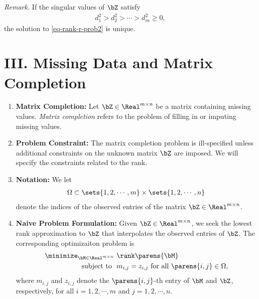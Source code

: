 \documentclass[12pt]{article}
\begin{document}
\begin{enumerate}[label=\textbf{\arabic*.}]
	\textit{Remark.} If the singular values of $\bZ$ satisfy 
	\begin{align*}
		d_1^2 > d_2^2 > \cdots > d_m^2 \ge 0, 
	\end{align*}
	the solution to \eqref{eq-rank-r-prob2} is unique. 

\end{enumerate}


\section*{III. Missing Data and Matrix Completion}

\begin{enumerate}[label=\textbf{\arabic*.}]

	\item \textbf{Matrix Completion:} Let $\bZ \in \Real^{m \times n}$ be a matrix containing missing values. \emph{Matrix completion} refers to the problem of filling in or imputing missing values. 
	
	\item \textbf{Problem Constraint:} The matrix completion problem is ill-specified unless additional constraints on the unknown matrix $\bZ$ are imposed. We will specify the constraints related to the rank. 
	
	\item \textbf{Notation:} We let 
	\begin{align*}
		\Omega \subset \sets{1, 2, \cdots, m} \times \sets{1, 2, \cdots, n}
	\end{align*}
	denote the indices of the observed entries of the matrix $\bZ \in \Real^{m \times n}$. 
	
	\item \textbf{Naive Problem Formulation:} Given $\bZ \in \Real^{m \times n}$, we seek the lowest rank approximation to $\bZ$ that interpolates the observed entries of $\bZ$. The corresponding optimizaiton problem is 
	\begin{equation}\label{eq-mat-completion-1}
		\begin{aligned}
			\minimize_{\bM \in \Real^{m \times n}} & \ \rank \parens{\bM}  \\ 
			\text{ subject to } & \  m_{i,j} = z_{i,j} \text{ for all } \parens{i, j} \in \Omega, 
		\end{aligned}
	\end{equation}
	where $m_{i,j}$ and $z_{i,j}$ denote the $\parens{i, j}$-th entry of $\bM$ and $\bZ$, respectively, for all $i = 1, 2, \cdots, m$ and $j = 1, 2, \cdots, n$. 
	

\end{enumerate}
\end{document}

